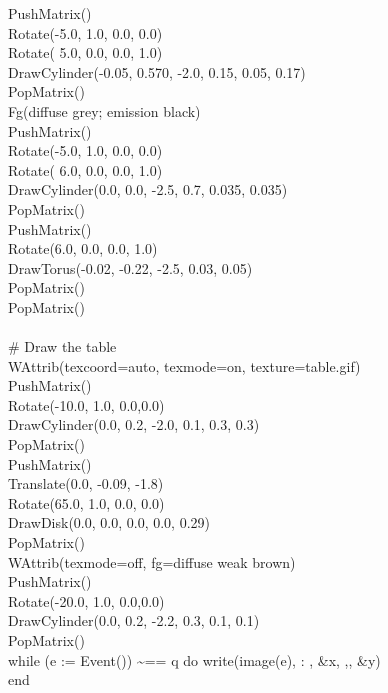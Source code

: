 {\>   PushMatrix() \\
\>   Rotate(-5.0, 1.0, 0.0, 0.0) \\
\>   Rotate( 5.0, 0.0, 0.0, 1.0) \\
\>   DrawCylinder(-0.05, 0.570, -2.0, 0.15, 0.05, 0.17) \\
\>   PopMatrix() \\
\>   Fg({\textquotedbl}diffuse grey; emission black{\textquotedbl}) \\
\>   PushMatrix() \\
\>   Rotate(-5.0, 1.0, 0.0, 0.0) \\
\>   Rotate( 6.0, 0.0, 0.0, 1.0) \\
\>   DrawCylinder(0.0, 0.0, -2.5, 0.7, 0.035, 0.035) \\
\>   PopMatrix() \\
\>   PushMatrix() \\
\>   Rotate(6.0, 0.0, 0.0, 1.0) \\
\>   DrawTorus(-0.02, -0.22, -2.5, 0.03, 0.05) \\
\>   PopMatrix()  \\
\>   PopMatrix() \\
\ \\
\>   \# Draw the table  \\
\>   WAttrib({\textquotedbl}texcoord=auto{\textquotedbl},
{\textquotedbl}texmode=on{\textquotedbl},
{\textquotedbl}texture=table.gif{\textquotedbl}) \\
\>   PushMatrix() \\
\>   Rotate(-10.0, 1.0, 0.0,0.0) \\
\>   DrawCylinder(0.0, 0.2, -2.0, 0.1, 0.3, 0.3) \\
\>   PopMatrix() \\
\>   PushMatrix() \\
\>   Translate(0.0, -0.09, -1.8) \\
\>   Rotate(65.0, 1.0, 0.0, 0.0) \\
\>   DrawDisk(0.0, 0.0, 0.0, 0.0, 0.29)  \\
\>   PopMatrix() \\
\>   WAttrib({\textquotedbl}texmode=off{\textquotedbl},
{\textquotedbl}fg=diffuse weak brown{\textquotedbl}) \\
\>   PushMatrix() \\
\>   Rotate(-20.0, 1.0, 0.0,0.0) \\
\>   DrawCylinder(0.0, 0.2, -2.2, 0.3, 0.1, 0.1) \\
\>   PopMatrix() \\
\>   while (e := Event()) \~{}== {\textquotedbl}q{\textquotedbl} do
        write(image(e), {\textquotedbl}: {\textquotedbl}, \&x,
{\textquotedbl},{\textquotedbl}, \&y) \\
end
}

